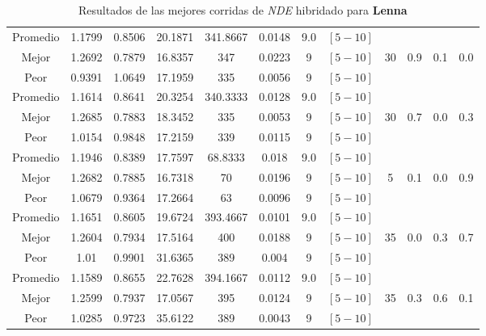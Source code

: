 \begin{table}[h!]
\begin{center}
\begin{tabular}{|c|c|c|c|c|c|c|c|c|c|c|c|}
        \hline
            Promedio  & 1.1799 & 0.8506 & 20.1871 & 341.8667 & 0.0148 & 9.0 & $[5-10]$ &  &  &  & \\
            \cline{1-8}
            Mejor & 1.2692 & 0.7879  & 16.8357 & 347 & 0.0223 & 9 & $[5-10]$ & 30 & 0.9 & 0.1 & 0.0\\
            \cline{1-8}
            Peor & 0.9391 & 1.0649  & 17.1959 & 335 & 0.0056 & 9 & $[5-10]$ &  &  &  & \\
        \hline
        \hline
            Promedio  & 1.1614 & 0.8641 & 20.3254 & 340.3333 & 0.0128 & 9.0 & $[5-10]$ &  &  &  & \\
            \cline{1-8}
            Mejor & 1.2685 & 0.7883  & 18.3452 & 335 & 0.0053 & 9 & $[5-10]$ & 30 & 0.7 & 0.0 & 0.3\\
            \cline{1-8}
            Peor & 1.0154 & 0.9848  & 17.2159 & 339 & 0.0115 & 9 & $[5-10]$ &  &  &  & \\
        \hline
        \hline
            Promedio  & 1.1946 & 0.8389 & 17.7597 & 68.8333 & 0.018 & 9.0 & $[5-10]$ &  &  &  & \\
            \cline{1-8}
            Mejor & 1.2682 & 0.7885  & 16.7318 & 70 & 0.0196 & 9 & $[5-10]$ & 5 & 0.1 & 0.0 & 0.9\\
            \cline{1-8}
            Peor & 1.0679 & 0.9364  & 17.2664 & 63 & 0.0096 & 9 & $[5-10]$ &  &  &  & \\
        \hline
        \hline
            Promedio  & 1.1651 & 0.8605 & 19.6724 & 393.4667 & 0.0101 & 9.0 & $[5-10]$ &  &  &  & \\
            \cline{1-8}
            Mejor & 1.2604 & 0.7934  & 17.5164 & 400 & 0.0188 & 9 & $[5-10]$ & 35 & 0.0 & 0.3 & 0.7\\
            \cline{1-8}
            Peor & 1.01 & 0.9901  & 31.6365 & 389 & 0.004 & 9 & $[5-10]$ &  &  &  & \\
        \hline
        \hline
            Promedio  & 1.1589 & 0.8655 & 22.7628 & 394.1667 & 0.0112 & 9.0 & $[5-10]$ &  &  &  & \\
            \cline{1-8}
            Mejor & 1.2599 & 0.7937  & 17.0567 & 395 & 0.0124 & 9 & $[5-10]$ & 35 & 0.3 & 0.6 & 0.1\\
            \cline{1-8}
            Peor & 1.0285 & 0.9723  & 35.6122 & 389 & 0.0043 & 9 & $[5-10]$ &  &  &  & \\
        \hline
        \end{tabular}
        \caption{Resultados de las mejores corridas de \emph{NDE} hibridado para {\bf Lenna}}
        \label{tb:tabledehibimg}
    \end{center}
\end{table}


